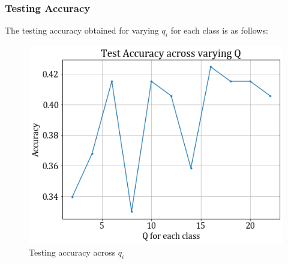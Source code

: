 \documentclass[11pt,a4paper]{article}
\begin{document}
\subsubsection{Testing Accuracy}
The testing accuracy obtained for varying $q_i$ for each class is as follows:
\begin{figure}[H]
    \centering
    \includegraphics[scale=0.5]{images/2A/2A_diag_test_acc.png}
    \caption{Testing accuracy across $q_i$}
\end{figure}
\end{document}
